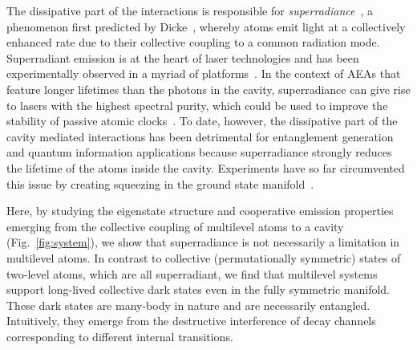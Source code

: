 \documentclass[aps,prx,superscriptaddress,twocolumn,notitlepage,nofootinbib,longbibliography]{revtex4-2}
\begin{document}
The dissipative part of the interactions is responsible for \emph{superradiance}~\cite{GrossHarocheSuperr,Benedict_book1996}, a phenomenon first predicted by Dicke~\cite{DickePR93}, whereby atoms emit light at a collectively enhanced rate due to their collective coupling to a common radiation mode. Superradiant emission  is at the heart of laser technologies and  has been experimentally observed in a myriad of platforms~\cite{Feld_PRL1973, DeTemple_PRA1981, Haroche_PRL1976, Flusberg_PLA1976, Gibbs_PRL1977, Hikspoors_PRL1977, Gounand_JPB1979, Haroche_PRL1979, Haroche_PRL1982, Haroche_PRA1983, HarocheKaluzny_PRL1983, Vrinceanu_PRA2007, WalkerDay_PRA2008,  FieldGrimes_PRA2017, Boyd_PRL1987, Kobayashi_book, Tubino_PRL2003, Hommel_NatPhys2007, KimbleGoban_PRL2015, Rolston_NatComm2017, Waks_NanoLett2018, WallraffMlynek_NatComm5, FelintoOliveira_PRA2014, KaiserAraujo_PRL2016, Bromley_NatComm2016, Zhang_PRL120, ThompsonNorcia_PRX2018, RufferRohlsberger_Science2010}. In the context of AEAs that feature longer lifetimes than the photons in the cavity,  superradiance can give rise to lasers with the highest spectral purity, which could be used to improve the stability of passive atomic clocks~\cite{HollandMeiser_PRL2009,ThompsonBohnet_Nature2012,ThompsonBohnet_PRL2012,ThompsonNorcia_PRX2016}. To date, however,  the   dissipative  part of the cavity mediated interactions has been detrimental  for entanglement generation and quantum information applications because  superradiance strongly reduces the lifetime of the atoms inside the cavity.
Experiments have so far circumvented this issue by creating
squeezing in the ground state manifold~\cite{VuleticLeroux_PRL2010, ReichelBarontini_Science2015, KasevichHosten_Science2016, VuleticBraverman_PRL2019}.




Here, by studying the eigenstate structure and cooperative emission properties emerging from the collective coupling of multilevel atoms to a cavity (Fig.~\ref{fig:system}), we show that superradiance is not necessarily  a limitation in multilevel atoms. 
In contrast to collective (permutationally symmetric) states of two-level atoms, which are all superradiant, we find that multilevel systems support long-lived collective dark states even in the fully symmetric manifold.
These dark states are many-body in nature and are necessarily entangled.
Intuitively, they emerge from the destructive interference of decay channels corresponding to different internal transitions.
\end{document}
